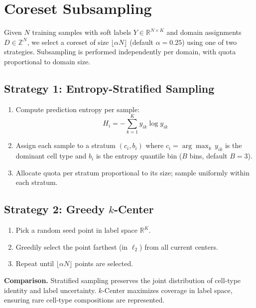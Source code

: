 \documentclass[11pt]{article}
\begin{document}
\section*{Coreset Subsampling}

Given $N$ training samples with soft labels $Y \in \mathbb{R}^{N \times K}$ and domain assignments $D \in \mathbb{Z}^N$, we select a coreset of size $\lfloor \alpha N \rfloor$ (default $\alpha = 0.25$) using one of two strategies. Subsampling is performed independently per domain, with quota proportional to domain size.

\subsection*{Strategy 1: Entropy-Stratified Sampling}

\begin{enumerate}
\item Compute prediction entropy per sample:
\begin{equation}
H_i = -\sum_{k=1}^{K} y_{ik} \log y_{ik}
\end{equation}
\item Assign each sample to a stratum $(c_i, b_i)$ where $c_i = \arg\max_k\, y_{ik}$ is the dominant cell type and $b_i$ is the entropy quantile bin ($B$ bins, default $B=3$).
\item Allocate quota per stratum proportional to its size; sample uniformly within each stratum.
\end{enumerate}

\subsection*{Strategy 2: Greedy $k$-Center}

\begin{enumerate}
\item Pick a random seed point in label space $\mathbb{R}^K$.
\item Greedily select the point farthest (in $\ell_2$) from all current centers.
\item Repeat until $\lfloor \alpha N \rfloor$ points are selected.
\end{enumerate}

\noindent\textbf{Comparison.} Stratified sampling preserves the joint distribution of cell-type identity and label uncertainty. $k$-Center maximizes coverage in label space, ensuring rare cell-type compositions are represented.
\end{document}
